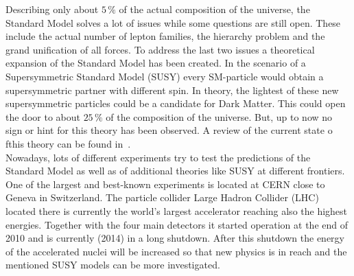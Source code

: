 Describing only about $5\,\%$ of the actual composition of the universe, the Standard Model solves a lot of issues while some questions are still open. These include the actual number of lepton families, the hierarchy problem and the grand unification of all forces. To address the last two issues a theoretical expansion of the Standard Model has been created. In the scenario of a Supersymmetric Standard Model (SUSY) every SM-particle would obtain a supersymmetric partner with different spin. In theory, the lightest of these new supersymmetric particles could be a candidate for Dark Matter. This could open the door to about $25\,\%$ of the composition of the universe. But, up to now no sign or hint for this theory has been observed. A review of the current state o fthis theory can be found in~\cite{Beringer:1900zz}. \\

Nowadays, lots of different experiments try to test the predictions of the Standard Model as well as of additional theories like SUSY at different frontiers. One of the largest and best-known experiments is located at CERN  close to Geneva in Switzerland. The particle collider Large Hadron Collider (LHC) located there is currently the world's largest accelerator reaching also the highest energies. Together with the four main detectors it started operation at the end of 2010 and is currently (2014) in a long shutdown. After this shutdown the energy of the accelerated nuclei will be increased so that new physics is in reach and the mentioned SUSY models can be more investigated. \\

